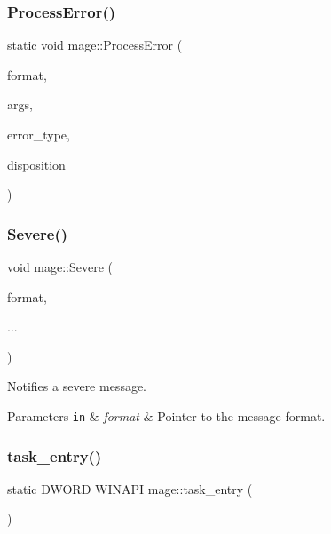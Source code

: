 \subsubsection{\texorpdfstring{Process\+Error()}{ProcessError()}}
{\footnotesize\ttfamily static void mage\+::\+Process\+Error (\begin{DoxyParamCaption}\item[{const char $\ast$}]{format,  }\item[{va\+\_\+list}]{args,  }\item[{const char $\ast$}]{error\+\_\+type,  }\item[{int}]{disposition }\end{DoxyParamCaption})\hspace{0.3cm}{\ttfamily [static]}}

\hypertarget{namespacemage_a95c8b0820c579bbde59062fd9d05e4f4}{}\label{namespacemage_a95c8b0820c579bbde59062fd9d05e4f4} 
\subsubsection{\texorpdfstring{Severe()}{Severe()}}
{\footnotesize\ttfamily void mage\+::\+Severe (\begin{DoxyParamCaption}\item[{const char $\ast$}]{format,  }\item[{}]{... }\end{DoxyParamCaption})}

Notifies a severe message.


\begin{DoxyParams}[1]{Parameters}
\mbox{\tt in}  & {\em format} & Pointer to the message format. \\
\hline
\end{DoxyParams}
\hypertarget{namespacemage_a9c89df2a328f65db59728cbea3fd1720}{}\label{namespacemage_a9c89df2a328f65db59728cbea3fd1720} 
\subsubsection{\texorpdfstring{task\+\_\+entry()}{task\_entry()}}
{\footnotesize\ttfamily static D\+W\+O\+RD W\+I\+N\+A\+PI mage\+::task\+\_\+entry (\begin{DoxyParamCaption}\item[{L\+P\+V\+O\+ID}]{ }\end{DoxyParamCaption})\hspace{0.3cm}{\ttfamily [static]}}

